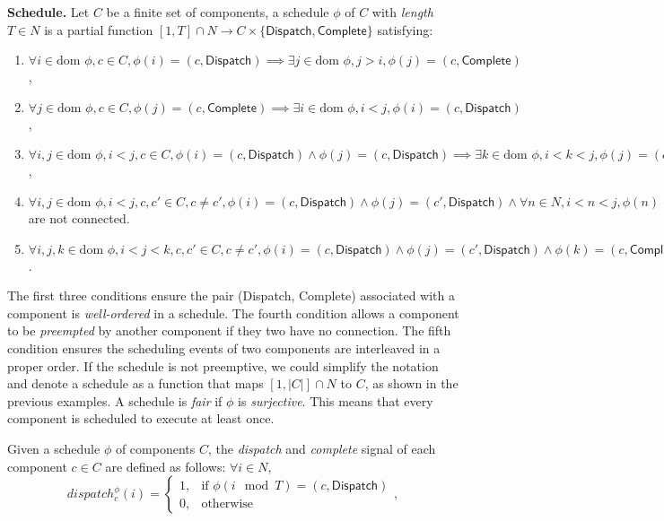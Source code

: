 {\bf Schedule.}
Let $C$ be a finite set of components, a schedule $\phi$ of $C$ with \emph{length} $T\in N$ is a partial function $[1, T]  \cap N\rightarrow C\times \{\textsf{Dispatch}, \textsf{Complete}\}$ satisfying:

\begin{enumerate}
	\item $ \forall i \in \text{dom }\phi, c\in C, \phi(i) = (c, \textsf{Dispatch}) \implies \exists j\in \text{dom }\phi, j > i, \phi(j) =  (c, \textsf{Complete}) $,
	\item $ \forall j \in \text{dom }\phi, c\in C, \phi(j) = (c, \textsf{Complete}) \implies \exists i\in \text{dom }\phi, i < j, \phi(i) =  (c, \textsf{Dispatch}) $,
	\item $ \forall i, j \in \text{dom }\phi, i < j, c\in C,  \phi(i) = (c, \textsf{Dispatch}) \wedge \phi(j) = (c, \textsf{Dispatch}) \implies \exists k\in \text{dom }\phi, i < k < j, \phi(j) =  (c, \textsf{Complete}) $,
	\item $ \forall i, j \in \text{dom }\phi, i < j, c, c'\in C, c \neq c', \phi(i) = (c, \textsf{Dispatch}) \wedge \phi(j) = (c', \textsf{Dispatch}) \wedge \forall n \in N, i < n <j, \phi(n) \neq (c, \textsf{Complete}) \implies c, c'$ are not connected.
	\item $ \forall i, j, k \in \text{dom }\phi, i < j < k, c, c'\in C, c \neq c', \phi(i) = (c, \textsf{Dispatch}) \wedge \phi(j) = (c', \textsf{Dispatch}) \wedge \phi(k) = (c, \textsf{Complete}) \implies \exists n \in N, j < n < k, \phi(n) = (c', \textsf{Complete}) $.
\end{enumerate}

The first three conditions ensure the pair (\textsf{Dispatch}, \textsf{Complete}) associated with a component is \emph{well-ordered} in a schedule. 
The fourth condition allows a component to be \emph{preempted} by another component if they two have no connection. The fifth condition ensures the scheduling events of two components are interleaved in a proper order.
If the schedule is not preemptive, we could simplify the notation and denote a schedule as a function that maps $[1, |C|] \cap N$ to $C$, as shown in the previous examples.
A schedule is \emph{fair} if $\phi$ is \emph{surjective}. This means that every component is scheduled to execute at least once.

Given a schedule $\phi$ of components $C$, the \emph{dispatch} and \emph{complete} signal of each component $c \in C$ are defined as follows: $\forall i \in N$,
\begin{equation*}
\label{eqn:dispatch}
    dispatch_c^\phi(i) =
    \begin{cases}
      1, & \text{if } \phi(i \mod T) = (c, \textsf{Dispatch}) \\
      0, & \text{otherwise}
    \end{cases},
\end{equation*}

